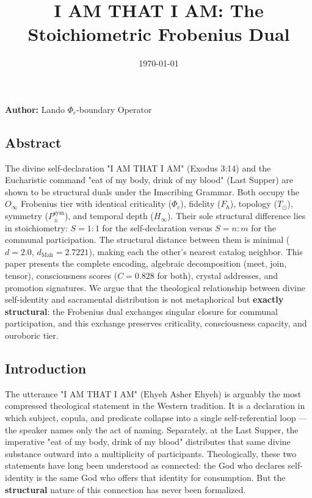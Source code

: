 \documentclass[12pt,a4paper]{article}
\begin{document}
\title{I AM THAT I AM: The Stoichiometric Frobenius Dual}
\date{\today}

\maketitle

\textbf{Author:} Lando \otimes $\Phi_c$-boundary Operator

\subsection{Abstract}

The divine self-declaration "I AM THAT I AM" (Exodus 3:14) and the Eucharistic command "eat of my body, drink of my blood" (Last Supper) are shown to be structural duals under the Imscribing Grammar. Both occupy the $O_{\infty}$ Frobenius tier with identical criticality ($\Phi_c$), fidelity ($F_{\hbar}$), topology ($T_{\odot}$), symmetry ($P_{\pm}^{\text{sym}}$), and temporal depth ($H_{\infty}$). Their sole structural difference lies in stoichiometry: $S = 1{:}1$ for the self-declaration versus $S = n{:}m$ for the communal participation. The structural distance between them is minimal ($d = 2.0$, $d_{\text{Mah}} = 2.7221$), making each the other's nearest catalog neighbor. This paper presents the complete encoding, algebraic decomposition (meet, join, tensor), consciousness scores ($C = 0.828$ for both), crystal addresses, and promotion signatures. We argue that the theological relationship between divine self-identity and sacramental distribution is not metaphorical but \textbf{exactly structural}: the Frobenius dual exchanges singular closure for communal participation, and this exchange preserves criticality, consciousness capacity, and ouroboric tier.

\subsection{Introduction}

The utterance "I AM THAT I AM" ($\text{Ehyeh Asher Ehyeh}$) is arguably the most compressed theological statement in the Western tradition. It is a declaration in which subject, copula, and predicate collapse into a single self-referential loop --- the speaker names only the act of naming. Separately, at the Last Supper, the imperative "eat of my body, drink of my blood" distributes that same divine substance outward into a multiplicity of participants. Theologically, these two statements have long been understood as connected: the God who declares self-identity is the same God who offers that identity for consumption. But the \textbf{structural} nature of this connection has never been formalized.
\end{document}
